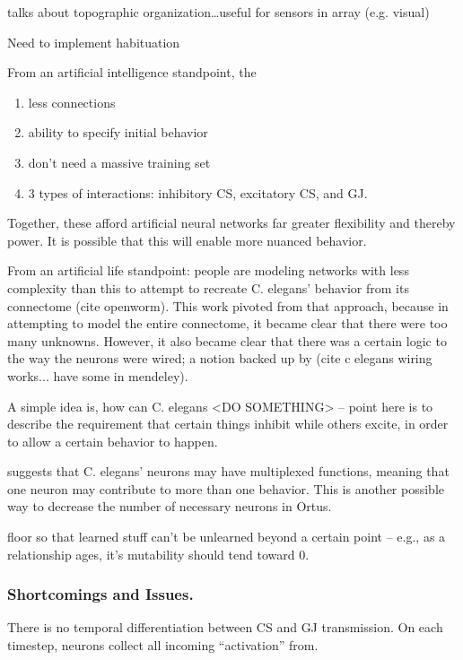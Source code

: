 \documentclass[letterpaper]{article}
\begin{document}
\cite{Weiner2015} talks about topographic organization\ldots useful for sensors in array (e.g. visual)

Need to implement habituation 

From an artificial intelligence standpoint, the

\begin{enumerate}
\item less connections
\item ability to specify initial behavior
\item don't need a massive training set
\item 3 types of interactions: inhibitory CS, excitatory CS, and GJ.
\end{enumerate}

Together, these afford artificial neural networks far greater flexibility and thereby power. It is possible that this will enable more nuanced behavior.

From an artificial life standpoint: people are modeling networks with less complexity than this to attempt to recreate C. elegans' behavior from its connectome (cite openworm). This work pivoted from that approach, because in attempting to model the entire connectome, it became clear that there were too many unknowns. However, it also became clear that there was a certain logic to the way the neurons were wired; a notion backed up by (cite c elegans wiring works... have some in mendeley).

A simple idea is, how can C. elegans <DO SOMETHING> -- point here is to describe the requirement that certain things inhibit while others excite, in order to allow a certain behavior to happen.



\citet{Schroter2017} suggests that C. elegans' neurons may have multiplexed functions, meaning that one neuron may contribute to more than one behavior. This is another possible way to decrease the number of necessary neurons in Ortus.


floor so that learned stuff can't be unlearned beyond a certain point -- e.g., as a relationship ages, it's mutability should tend toward 0.


\subsubsection{Shortcomings and Issues.}
There is no temporal differentiation between CS and GJ transmission. On each timestep, neurons collect all incoming ``activation'' from.
\end{document}
